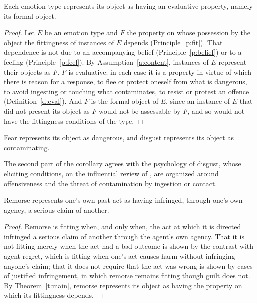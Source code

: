 \documentclass{situationist-preprint}
\begin{document}
\begin{theorem}\label{t:main}
Each emotion type represents its object as having an evaluative property, namely its formal object.
\end{theorem}

\begin{proof}
Let $E$ be an emotion type and $F$ the property on whose possession by the object the fittingness of instances of $E$ depends (Principle~\ref{p:fit}). That dependence is not due to an accompanying belief (Principle~\ref{p:belief}) or to a feeling (Principle~\ref{p:feel}). By Assumption~\ref{a:content}, instances of $E$ represent their objects as $F$. $F$ is evaluative: in each case it is a property in virtue of which there is reason for a response, to flee or protect oneself from what is dangerous, to avoid ingesting or touching what contaminates, to resist or protest an offence (Definition~\ref{d:eval}). And $F$ is the formal object of $E$, since an instance of $E$ that did not present its object as $F$ would not be assessable by $F$, and so would not have the fittingness conditions of the type.
\end{proof}

\begin{corollary}\label{c:fear}
Fear represents its object as dangerous, and disgust represents its object as contaminating.
\end{corollary}

The second part of the corollary agrees with the psychology of disgust, whose eliciting conditions, on the influential review of \citet{RozinFallon1987}, are organized around offensiveness and the threat of contamination by ingestion or contact.

\begin{corollary}\label{c:remorse}
Remorse represents one's own past act as having infringed, through one's own agency, a serious claim of another.
\end{corollary}

\begin{proof}
Remorse is fitting when, and only when, the act at which it is directed infringed a serious claim of another through the agent's own agency. That it is not fitting merely when the act had a bad outcome is shown by the contrast with agent-regret, which is fitting when one's act causes harm without infringing anyone's claim; that it does not require that the act was wrong is shown by cases of justified infringement, in which remorse remains fitting though guilt does not. By Theorem~\ref{t:main}, remorse represents its object as having the property on which its fittingness depends.
\end{proof}
\end{document}

